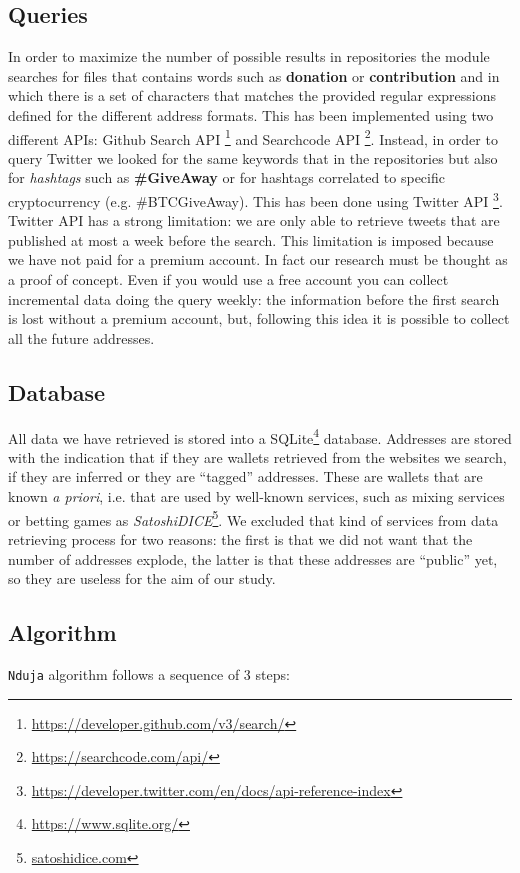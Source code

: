 \subsection{Queries} 
\label{sec:queries}
In order to maximize the number of possible results in repositories the module
\walletcollector{} searches for files that contains words such as
\textbf{donation} or \textbf{contribution} and in which there is a set of
characters that matches the provided regular expressions defined for the 
different address formats. This has been implemented using two different APIs: Github Search API \footnote{\url{https://developer.github.com/v3/search/}} and
Searchcode API \footnote{\url{https://searchcode.com/api/}}.
Instead, in order to query Twitter we looked for the same keywords that in the
repositories but also for \textit{hashtags} such as \textbf{\#GiveAway} or for
hashtags correlated to specific cryptocurrency (e.g. \#BTCGiveAway). This has
been done using Twitter API
\footnote{\url{https://developer.twitter.com/en/docs/api-reference-index}}.
Twitter API has a strong limitation: we are only able to retrieve tweets that
are published at most a week before the search. This limitation is imposed
because we have not paid for a premium account. In fact our research must be
thought as a proof of concept. Even if you would use a free account you can
collect incremental data doing the query weekly: the information before the
first search is lost without a premium account, but, following this idea it is
possible to collect all the future addresses.

\subsection{Database}
All data we have retrieved is stored into a
SQLite\footnote{\url{https://www.sqlite.org/}} database. Addresses are stored
with the indication that if they are wallets retrieved from the websites we search,
if they are inferred or they are ``tagged'' addresses. These are wallets that
are known \emph{a priori}, i.e. that are used by well-known services, such as mixing services or betting games as
\textit{SatoshiDICE}\footnote{\url{satoshidice.com}}. 
We excluded that kind of
services from data retrieving process for two reasons: the first is that we did
not want that the number of addresses explode, the latter is that these
addresses are ``public'' yet, so they are useless for the aim of our study.

\subsection{Algorithm}
\texttt{Nduja} algorithm follows a sequence of 3 steps:
